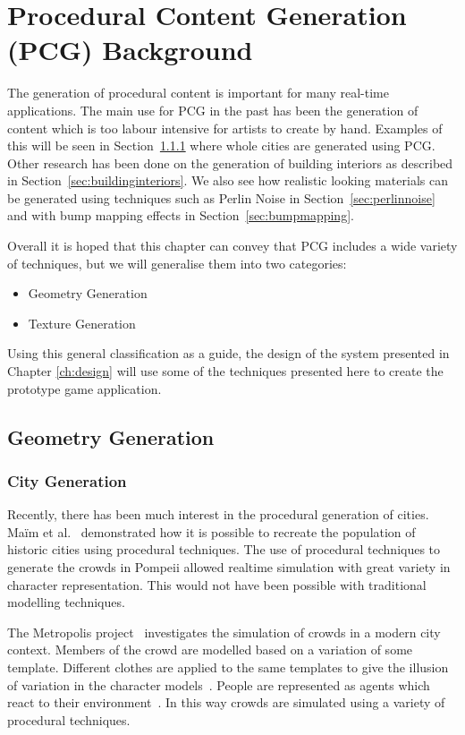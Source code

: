 \chapter{Procedural Content Generation (PCG) Background}
\label{ch:backgroundpcg}
The generation of procedural content is important for many real-time applications. 
The main use for PCG in the past has been the generation of content which is too labour intensive for artists to create by hand.
Examples of this will be seen in Section~\ref{sec:citygen} where whole cities are generated using PCG.
Other research has been done on the generation of building interiors as described in Section~\ref{sec:buildinginteriors}.
We also see how realistic looking materials can be generated using techniques such as Perlin Noise in Section~\ref{sec:perlinnoise} and with bump mapping effects in Section~\ref{sec:bumpmapping}.

Overall it is hoped that this chapter can convey that PCG includes a wide variety of techniques, but we will generalise them into two categories:
\begin{itemize}
	\item Geometry Generation
	\item Texture Generation
\end{itemize}
Using this general classification as a guide, the design of the system presented in Chapter \ref{ch:design} will use some of the techniques presented here to create the prototype game application.

\section{Geometry Generation}
\subsection{City Generation}
\label{sec:citygen}
Recently, there has been much interest in the procedural generation of cities.
Ma\"{i}m et al.~\cite{maim2007populating} demonstrated how it is possible to recreate the population of historic cities using procedural techniques.
The use of procedural techniques to generate the crowds in Pompeii allowed realtime simulation with great variety in character representation.
This would not have been possible with traditional modelling techniques.

The Metropolis project~\cite{web:metropolis} investigates the simulation of crowds in a modern city context.
Members of the crowd are modelled based on a variation of some template.
Different clothes are applied to the same templates to give the illusion of variation in the character models~\cite{mcdonnell2007pipeline}.
People are represented as agents which react to their environment~\cite{ulicny2002towards}.
In this way crowds are simulated using a variety of procedural techniques.


